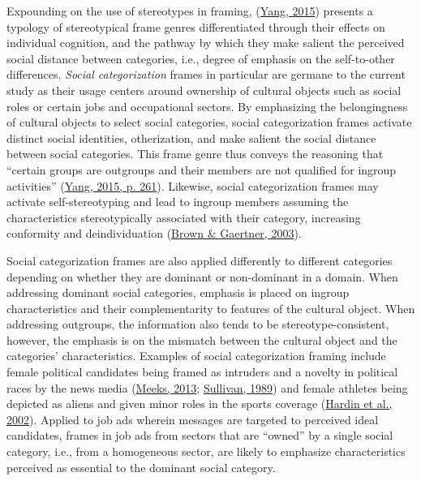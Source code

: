 \documentclass[
  12pt,
  letterpaper,
  DIV=11,
  numbers=noendperiod]{scrartcl}
\begin{document}
Expounding on the use of stereotypes in framing,
(\protect\hyperlink{ref-Yang2015a}{Yang, 2015}) presents a typology of
stereotypical frame genres differentiated through their effects on
individual cognition, and the pathway by which they make salient the
perceived social distance between categories, i.e., degree of emphasis
on the self-to-other differences. \emph{Social categorization} frames in
particular are germane to the current study as their usage centers
around ownership of cultural objects such as social roles or certain
jobs and occupational sectors. By emphasizing the belongingness of
cultural objects to select social categories, social categorization
frames activate distinct social identities, otherization, and make
salient the social distance between social categories. This frame genre
thus conveys the reasoning that ``certain groups are outgroups and their
members are not qualified for ingroup activities''
(\protect\hyperlink{ref-Yang2015a}{Yang, 2015, p. 261}). Likewise,
social categorization frames may activate self-stereotyping and lead to
ingroup members assuming the characteristics stereotypically associated
with their category, increasing conformity and deindividuation
(\protect\hyperlink{ref-brown2003BlackwellHandbookSocial}{Brown \&
Gaertner, 2003}).

Social categorization frames are also applied differently to different
categories depending on whether they are dominant or non-dominant in a
domain. When addressing dominant social categories, emphasis is placed
on ingroup characteristics and their complementarity to features of the
cultural object. When addressing outgroups, the information also tends
to be stereotype-consistent, however, the emphasis is on the mismatch
between the cultural object and the categories' characteristics.
Examples of social categorization framing include female political
candidates being framed as intruders and a novelty in political races by
the news media (\protect\hyperlink{ref-meeks_all_2013}{Meeks, 2013};
\protect\hyperlink{ref-sullivan19891984VicePresidential}{Sullivan,
1989}) and female athletes being depicted as aliens and given minor
roles in the sports coverage
(\protect\hyperlink{ref-hardin2002FramingSexualDifference}{Hardin et
al., 2002}). Applied to job ads wherein messages are targeted to
perceived ideal candidates, frames in job ads from sectors that are
``owned'' by a single social category, i.e., from a homogeneous sector,
are likely to emphasize characteristics perceived as essential to the
dominant social category.
\end{document}

